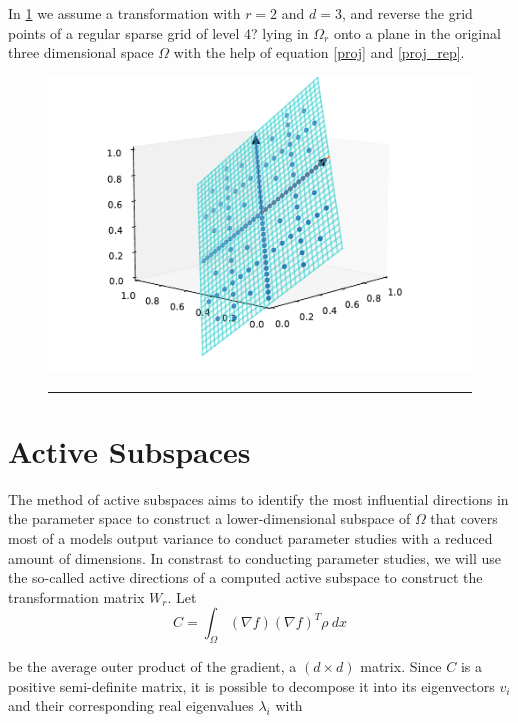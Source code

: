 \documentclass[
  a4paper,  %
  twoside,  %
  bibliography=totoc,
  headsepline,
  cleardoublepage=empty,
  parskip=half,
  draft=false
]{scrbook}
\newcommand{\delimit}{{\color{charcoal}\noindent\rule{\textwidth}{1pt}}}
\begin{document}
In \cref{fig:trans_vis} we assume a transformation with $r=2$ and $d=3$, and reverse the grid points of a regular sparse grid of level $4$? lying in $\Omega_r$ onto a plane in the original three dimensional space $\Omega$ with the help of equation \cref{proj} and \cref{proj_rep}.

\newpage
\begin{mdframed}[style=style]
\begin{figure}[H]
\centering
  \includegraphics[width=.7\linewidth]{graphics/surrogate_vis}
  \delimit
  \label{fig:trans_vis}
\end{figure}
\end{mdframed}

\section{Active Subspaces}
\label{sec:as}

The method of active subspaces \cite{CG15} aims to identify the most influential directions in the parameter space to construct a lower-dimensional subspace of $\Omega$ that covers most of a models output variance to conduct parameter studies with a reduced amount of dimensions.
In constrast to conducting parameter studies, we will use the so-called active directions of a computed active subspace to construct the transformation matrix $W_r$.
Let
\begin{equation}
C = \int_{\Omega} (\nabla f) (\nabla f)^T \rho ~ dx
\label{eq:as_c}
\end{equation}

be the average outer product of the gradient, a $(d \times d)$ matrix.
Since $C$ is a positive semi-definite matrix, it is possible to decompose it into its eigenvectors $v_i$ and their corresponding real eigenvalues $\lambda_i$ with
\end{document}
